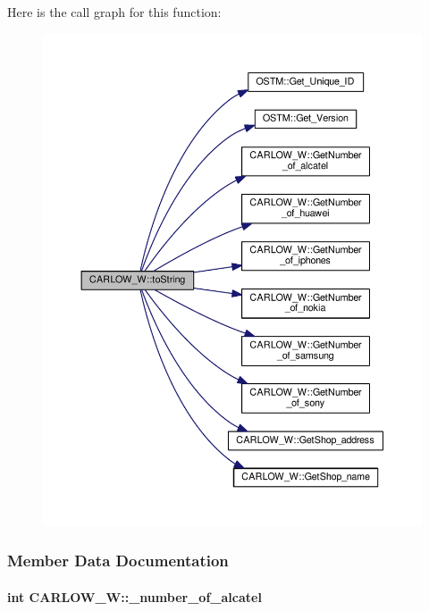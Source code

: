 Here is the call graph for this function\+:\nopagebreak
\begin{figure}[H]
\begin{center}
\leavevmode
\includegraphics[width=350pt]{class_c_a_r_l_o_w___w_a79e683650f861b59752fb027a5f16e5a_a79e683650f861b59752fb027a5f16e5a_cgraph}
\end{center}
\end{figure}




\subsubsection{Member Data Documentation}
\paragraph[{\texorpdfstring{\+\_\+number\+\_\+of\+\_\+alcatel}{_number_of_alcatel}}]{\setlength{\rightskip}{0pt plus 5cm}int C\+A\+R\+L\+O\+W\+\_\+\+W\+::\+\_\+number\+\_\+of\+\_\+alcatel\hspace{0.3cm}{\ttfamily [private]}}\hypertarget{class_c_a_r_l_o_w___w_acf1f9888b2ac011cd0e8bb49b10abd91_acf1f9888b2ac011cd0e8bb49b10abd91}{}\label{class_c_a_r_l_o_w___w_acf1f9888b2ac011cd0e8bb49b10abd91_acf1f9888b2ac011cd0e8bb49b10abd91}


